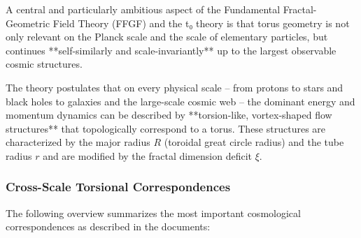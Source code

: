 A central and particularly ambitious aspect of the Fundamental Fractal-Geometric Field Theory (FFGF) and the t₀ theory is that torus geometry is not only relevant on the Planck scale and the scale of elementary particles, but continues **self-similarly and scale-invariantly** up to the largest observable cosmic structures.

The theory postulates that on every physical scale – from protons to stars and black holes to galaxies and the large-scale cosmic web – the dominant energy and momentum dynamics can be described by **torsion-like, vortex-shaped flow structures** that topologically correspond to a torus. These structures are characterized by the major radius $R$ (toroidal great circle radius) and the tube radius $r$ and are modified by the fractal dimension deficit $\xi$.

\subsubsection{Cross-Scale Torsional Correspondences}

The following overview summarizes the most important cosmological correspondences as described in the documents:

